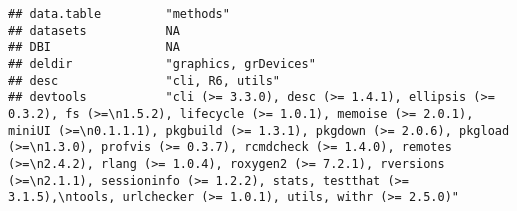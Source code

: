 \documentclass[
]{article}
\begin{document}
\begin{verbatim}
## data.table         "methods"                                                                                                                                                                                                                                                                                                                                                                                                                                    
## datasets           NA                                                                                                                                                                                                                                                                                                                                                                                                                                           
## DBI                NA                                                                                                                                                                                                                                                                                                                                                                                                                                           
## deldir             "graphics, grDevices"                                                                                                                                                                                                                                                                                                                                                                                                                        
## desc               "cli, R6, utils"                                                                                                                                                                                                                                                                                                                                                                                                                             
## devtools           "cli (>= 3.3.0), desc (>= 1.4.1), ellipsis (>= 0.3.2), fs (>=\n1.5.2), lifecycle (>= 1.0.1), memoise (>= 2.0.1), miniUI (>=\n0.1.1.1), pkgbuild (>= 1.3.1), pkgdown (>= 2.0.6), pkgload (>=\n1.3.0), profvis (>= 0.3.7), rcmdcheck (>= 1.4.0), remotes (>=\n2.4.2), rlang (>= 1.0.4), roxygen2 (>= 7.2.1), rversions (>=\n2.1.1), sessioninfo (>= 1.2.2), stats, testthat (>= 3.1.5),\ntools, urlchecker (>= 1.0.1), utils, withr (>= 2.5.0)"

\end{verbatim}
\end{document}
